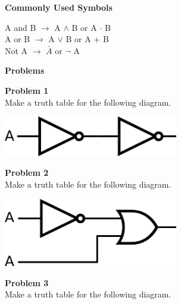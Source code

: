\documentclass[11pt]{report}
\begin{document}
\vspace{10mm}
\begin{center}
	\Large
	\textbf{Commonly Used Symbols}
	\normalsize
	
	A and B $\rightarrow$ A $\wedge$ B or A $\cdot$ B\\
	A or B $\rightarrow$ A $\vee $ B or A + B\\
	Not A $\rightarrow$ $\bar{A}$ or $\neg$ A\\
\end{center}

\newpage
\begin{center}
    \large{\textbf{Problems}}
\end{center}
\begin{center}
    \textbf{Problem 1}\\
    Make a truth table for the following diagram.
    \vspace{.8in}
\end{center}
\begin{center}
    \begin{minipage}{\linewidth}
        \includegraphics[width=3in]{images/notnot.png}
    \end{minipage}
\end{center}
\vspace{3in}
\begin{center}
    \textbf{Problem 2}\\
    Make a truth table for the following diagram.
    \vspace{.8in}
\end{center}
\begin{center}
    \begin{minipage}{\linewidth}
        \includegraphics[width=3in]{images/tautology.png}
    \end{minipage}
\end{center}
\vspace{2in}
\begin{center}
    \textbf{Problem 3}\\
    Make a truth table for the following diagram.
    \vspace{.8in}
\end{center}
\end{document}
